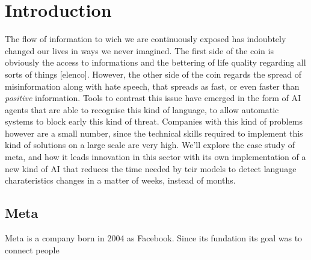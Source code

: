 \section{Introduction}

The flow of information to wich we are continuously exposed has
indoubtely changed our lives in ways we never imagined. The first side
of the coin is obviously the access to informations and the bettering
of life quality regarding all sorts of things [elenco]. However, the
other side of the coin regards the spread of misinformation along with
hate speech, that spreads as fast, or even faster than \emph{positive}
information. Tools to contrast this issue have emerged in the form of
AI agents that are able to recognise this kind of language, to allow
automatic systems to block early this kind of threat. Companies with
this kind of problems however are a small number, since the technical
skills required to implement this kind of solutions on a large scale
are very high. We'll explore the case study of meta, and how it leads
innovation in this sector with its own implementation of a new kind of
AI that reduces the time needed by teir models to detect language
charateristics changes in a matter of weeks, instead of months.

\subsection{Meta}
Meta is a company born in 2004 as Facebook. Since its fundation its
goal was to connect people
